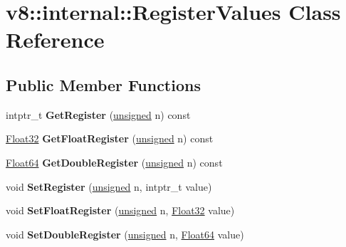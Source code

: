 \hypertarget{classv8_1_1internal_1_1RegisterValues}{}\section{v8\+:\+:internal\+:\+:Register\+Values Class Reference}
\label{classv8_1_1internal_1_1RegisterValues}
\subsection*{Public Member Functions}
\begin{DoxyCompactItemize}
\item 
\mbox{\label{classv8_1_1internal_1_1RegisterValues_aeec0a344287fcb90743086ed69d233df}} 
intptr\+\_\+t {\bfseries Get\+Register} (\mbox{\hyperlink{classunsigned}{unsigned}} n) const
\item 
\mbox{\label{classv8_1_1internal_1_1RegisterValues_ac83dd49c59fda7fa6e25f87745f09363}} 
\mbox{\hyperlink{classv8_1_1internal_1_1Float32}{Float32}} {\bfseries Get\+Float\+Register} (\mbox{\hyperlink{classunsigned}{unsigned}} n) const
\item 
\mbox{\label{classv8_1_1internal_1_1RegisterValues_a84fba058d4c00ed6a13e70595412bab0}} 
\mbox{\hyperlink{classv8_1_1internal_1_1Float64}{Float64}} {\bfseries Get\+Double\+Register} (\mbox{\hyperlink{classunsigned}{unsigned}} n) const
\item 
\mbox{\label{classv8_1_1internal_1_1RegisterValues_a3bbaf57efac5a4f0b735966a61f588ce}} 
void {\bfseries Set\+Register} (\mbox{\hyperlink{classunsigned}{unsigned}} n, intptr\+\_\+t value)
\item 
\mbox{\label{classv8_1_1internal_1_1RegisterValues_a0e5169c535b8d7a74e3ef6435a23cf27}} 
void {\bfseries Set\+Float\+Register} (\mbox{\hyperlink{classunsigned}{unsigned}} n, \mbox{\hyperlink{classv8_1_1internal_1_1Float32}{Float32}} value)
\item 
\mbox{\label{classv8_1_1internal_1_1RegisterValues_a66e8cff41b74fc338a96d588929646f4}} 
void {\bfseries Set\+Double\+Register} (\mbox{\hyperlink{classunsigned}{unsigned}} n, \mbox{\hyperlink{classv8_1_1internal_1_1Float64}{Float64}} value)
\end{DoxyCompactItemize}
